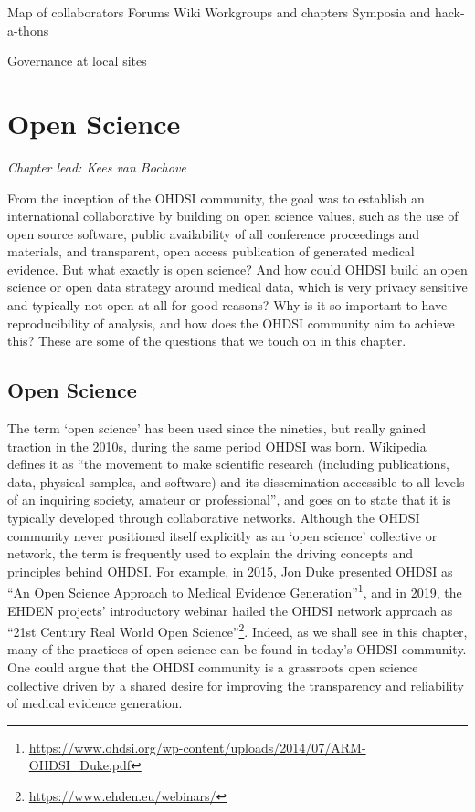 \documentclass[11pt]{book}
\let\rmarkdownfootnote\footnote%
\def\footnote{\protect\rmarkdownfootnote}
\theoremstyle{definition}
\theoremstyle{definition}
\theoremstyle{definition}
\theoremstyle{remark}
\begin{document}
Map of collaborators
Forums
Wiki
Workgroups and chapters
Symposia and hack-a-thons

Governance at local sites

\hypertarget{OpenScience}{%
\chapter{Open Science}\label{OpenScience}}


\emph{Chapter lead: Kees van Bochove}

From the inception of the OHDSI community, the goal was to establish an international collaborative by building on open science values, such as the use of open source software, public availability of all conference proceedings and materials, and transparent, open access publication of generated medical evidence. But what exactly is open science? And how could OHDSI build an open science or open data strategy around medical data, which is very privacy sensitive and typically not open at all for good reasons? Why is it so important to have reproducibility of analysis, and how does the OHDSI community aim to achieve this? These are some of the questions that we touch on in this chapter.

\hypertarget{open-science}{%
\section{Open Science}\label{open-science}}

The term `open science' has been used since the nineties, but really gained traction in the 2010s, during the same period OHDSI was born. Wikipedia \citep{wiki:Open_science} defines it as ``the movement to make scientific research (including publications, data, physical samples, and software) and its dissemination accessible to all levels of an inquiring society, amateur or professional'', and goes on to state that it is typically developed through collaborative networks. Although the OHDSI community never positioned itself explicitly as an `open science' collective or network, the term is frequently used to explain the driving concepts and principles behind OHDSI. For example, in 2015, Jon Duke presented OHDSI as ``An Open Science Approach to Medical Evidence Generation''\footnote{\url{https://www.ohdsi.org/wp-content/uploads/2014/07/ARM-OHDSI_Duke.pdf}}, and in 2019, the EHDEN projects' introductory webinar hailed the OHDSI network approach as ``21st Century Real World Open Science''\footnote{\url{https://www.ehden.eu/webinars/}}. Indeed, as we shall see in this chapter, many of the practices of open science can be found in today's OHDSI community. One could argue that the OHDSI community is a grassroots open science collective driven by a shared desire for improving the transparency and reliability of medical evidence generation.
\end{document}
